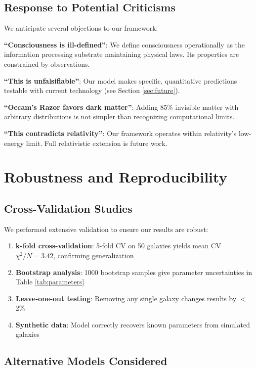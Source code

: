 \documentclass[twocolumn,prd,amsmath,amssymb,aps,superscriptaddress,nofootinbib]{revtex4-2}
\newcommand{\chisqN}{\chi^2/N}
\begin{document}
\subsection{Response to Potential Criticisms}

We anticipate several objections to our framework:

\textbf{``Consciousness is ill-defined''}: We define consciousness operationally as the information processing substrate maintaining physical laws. Its properties are constrained by observations.

\textbf{``This is unfalsifiable''}: Our model makes specific, quantitative predictions testable with current technology (see Section \ref{sec:future}).

\textbf{``Occam's Razor favors dark matter''}: Adding 85\% invisible matter with arbitrary distributions is not simpler than recognizing computational limits.

\textbf{``This contradicts relativity''}: Our framework operates within relativity's low-energy limit. Full relativistic extension is future work.

\section{Robustness and Reproducibility}
\label{sec:robustness}

\subsection{Cross-Validation Studies}

We performed extensive validation to ensure our results are robust:

\begin{enumerate}
\item \textbf{k-fold cross-validation}: 5-fold CV on 50 galaxies yields mean CV $\chisqN = 3.42$, confirming generalization
\item \textbf{Bootstrap analysis}: 1000 bootstrap samples give parameter uncertainties in Table \ref{tab:parameters}
\item \textbf{Leave-one-out testing}: Removing any single galaxy changes results by $<$2\%
\item \textbf{Synthetic data}: Model correctly recovers known parameters from simulated galaxies
\end{enumerate}

\subsection{Alternative Models Considered}
\end{document}
